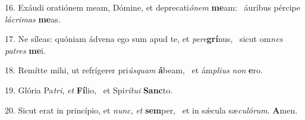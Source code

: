 16. Exáudi oratiónem meam, Dómine, et deprecati\textit{ó}\textit{nem} \textbf{me}am: \ast\  áuribus pércipe \textit{lá}\textit{cri}\textit{mas} \textbf{me}as.\

17. Ne síleas: quóniam ádvena ego sum apud te, et \textit{per}\textit{e}\textbf{grí}nus, \ast\  sicut om\textit{nes} \textit{pa}\textit{tres} \textbf{me}i.\

18. Remítte mihi, ut refrígerer pri\textit{ús}\textit{quam} \textbf{á}beam, \ast\  et ám\textit{pli}\textit{us} \textit{non} \textbf{e}ro.\

19. Glória Pa\textit{tri}, \textit{et} \textbf{Fí}lio, \ast\  et Spi\textit{rí}\textit{tu}\textit{i} \textbf{Sanc}to.\

20. Sicut erat in princípio, et \textit{nunc}, \textit{et} \textbf{sem}per, \ast\  et in sǽcula sæ\textit{cu}\textit{ló}\textit{rum}. \textbf{A}men.\


